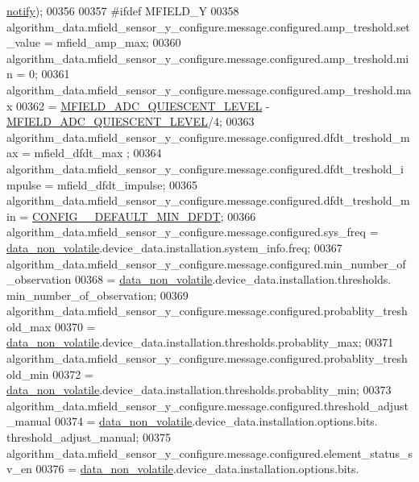 \begin{DoxyCode}
{{{{{      \hyperlink{a00019_a8e6a04c2283f9fd7b8dcbc62faba5847}{notify});
00356 
00357 \textcolor{preprocessor}{#ifdef MFIELD\_Y}
00358     algorithm\_data.mfield\_sensor\_y\_configure.message.configured.amp\_treshold.set\_value    = mfield\_amp\_max;
00360     algorithm\_data.mfield\_sensor\_y\_configure.message.configured.amp\_treshold.min          = 0;
00361     algorithm\_data.mfield\_sensor\_y\_configure.message.configured.amp\_treshold.max          
00362                              = \hyperlink{a00019_a2310c2bd339d54b86e9fae262def2008}{MFIELD\_ADC\_QUIESCENT\_LEVEL} - 
      \hyperlink{a00019_a2310c2bd339d54b86e9fae262def2008}{MFIELD\_ADC\_QUIESCENT\_LEVEL}/4;
00363     algorithm\_data.mfield\_sensor\_y\_configure.message.configured.dfdt\_treshold\_max         = mfield\_dfdt\_max
      ;
00364     algorithm\_data.mfield\_sensor\_y\_configure.message.configured.dfdt\_treshold\_impulse     = 
      mfield\_dfdt\_impulse;
00365     algorithm\_data.mfield\_sensor\_y\_configure.message.configured.dfdt\_treshold\_min         = 
      \hyperlink{a00021_a0eae7c540b766617bb00f79cd63415a2}{CONFIG\_\_DEFAULT\_MIN\_DFDT};
00366     algorithm\_data.mfield\_sensor\_y\_configure.message.configured.sys\_freq                  = 
      \hyperlink{a00060_a76ac5f917f5308dcd83de0d7c94559fb}{data\_non\_volatile}.device\_data.installation.system\_info.freq;
00367     algorithm\_data.mfield\_sensor\_y\_configure.message.configured.min\_number\_of\_observation
00368                    = \hyperlink{a00060_a76ac5f917f5308dcd83de0d7c94559fb}{data\_non\_volatile}.device\_data.installation.thresholds.
      min\_number\_of\_observation;
00369     algorithm\_data.mfield\_sensor\_y\_configure.message.configured.probablity\_treshold\_max
00370                    = \hyperlink{a00060_a76ac5f917f5308dcd83de0d7c94559fb}{data\_non\_volatile}.device\_data.installation.thresholds.probablity\_max;
00371     algorithm\_data.mfield\_sensor\_y\_configure.message.configured.probablity\_treshold\_min
00372                    = \hyperlink{a00060_a76ac5f917f5308dcd83de0d7c94559fb}{data\_non\_volatile}.device\_data.installation.thresholds.probablity\_min;
00373     algorithm\_data.mfield\_sensor\_y\_configure.message.configured.threshold\_adjust\_manual
00374                    = \hyperlink{a00060_a76ac5f917f5308dcd83de0d7c94559fb}{data\_non\_volatile}.device\_data.installation.options.bits.
      threshold\_adjust\_manual;
00375     algorithm\_data.mfield\_sensor\_y\_configure.message.configured.element\_status\_sv\_en
00376                    = \hyperlink{a00060_a76ac5f917f5308dcd83de0d7c94559fb}{data\_non\_volatile}.device\_data.installation.options.bits.
}}}}}
\end{DoxyCode}
